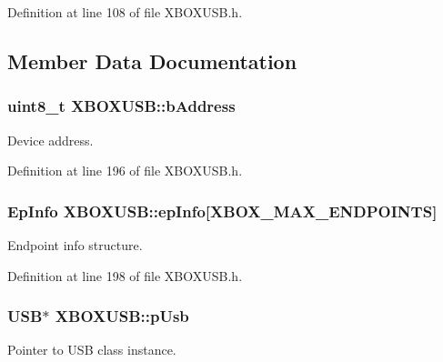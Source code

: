 \-Definition at line 108 of file \-X\-B\-O\-X\-U\-S\-B.\-h.



\subsection{\-Member \-Data \-Documentation}
\hypertarget{class_x_b_o_x_u_s_b_a5e9c00af9f4b978c53819791b0a0eb65}{
\subsubsection[{b\-Address}]{\setlength{\rightskip}{0pt plus 5cm}uint8\-\_\-t {\bf \-X\-B\-O\-X\-U\-S\-B\-::b\-Address}}}\label{class_x_b_o_x_u_s_b_a5e9c00af9f4b978c53819791b0a0eb65}
\-Device address. 

\-Definition at line 196 of file \-X\-B\-O\-X\-U\-S\-B.\-h.

\hypertarget{class_x_b_o_x_u_s_b_abef4a852d877d8136f198431ce54550f}{
\subsubsection[{ep\-Info}]{\setlength{\rightskip}{0pt plus 5cm}\-Ep\-Info {\bf \-X\-B\-O\-X\-U\-S\-B\-::ep\-Info}\mbox{[}{\bf \-X\-B\-O\-X\-\_\-\-M\-A\-X\-\_\-\-E\-N\-D\-P\-O\-I\-N\-T\-S}\mbox{]}}}\label{class_x_b_o_x_u_s_b_abef4a852d877d8136f198431ce54550f}
\-Endpoint info structure. 

\-Definition at line 198 of file \-X\-B\-O\-X\-U\-S\-B.\-h.

\hypertarget{class_x_b_o_x_u_s_b_a9c701658d4f63b5407cbcd5b78d8eb18}{
\subsubsection[{p\-Usb}]{\setlength{\rightskip}{0pt plus 5cm}\-U\-S\-B$\ast$ {\bf \-X\-B\-O\-X\-U\-S\-B\-::p\-Usb}}}\label{class_x_b_o_x_u_s_b_a9c701658d4f63b5407cbcd5b78d8eb18}
\-Pointer to \-U\-S\-B class instance. 

